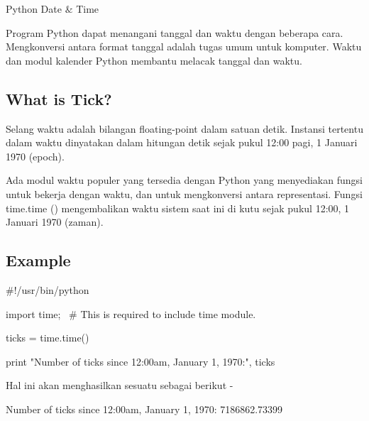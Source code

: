 \documentclass[a4paper,12pt]{report}
\begin{document}
\sloppy
\begin{center}{\fontsize{24pt}{24pt}\selectfont Python Date  $  \&  $ Time \\}\end{center} \par
\vspace{12pt}
\begin{adjustwidth}{0.03in}{0.03in}
 \hspace*{0.5in} Program Python dapat menangani tanggal dan waktu dengan beberapa cara. Mengkonversi antara format tanggal adalah tugas umum untuk komputer. Waktu dan modul kalender Python membantu melacak tanggal dan waktu.\end{adjustwidth}
 \par
\subsection*{What is Tick?}
 \par
\noindent 
Selang waktu adalah bilangan floating-point dalam satuan detik. Instansi tertentu dalam waktu dinyatakan dalam hitungan detik sejak pukul 12:00 pagi, 1 Januari 1970 (epoch). \par
\noindent 
Ada modul waktu populer yang tersedia dengan Python yang menyediakan fungsi untuk bekerja dengan waktu, dan untuk mengkonversi antara representasi. Fungsi time.time () mengembalikan waktu sistem saat ini di kutu sejak pukul 12:00, 1 Januari 1970 (zaman). \par
\vspace{12pt}
\subsection*{Example}
 \par
\vspace{12pt}
\noindent 
 \hspace*{0.5in}  $  \#  $!/usr/bin/python \par
\noindent 
 \hspace*{0.5in} import time;~  $  \#  $ This is required to include time module. \par
\vspace{12pt}
\noindent 
 \hspace*{0.5in} ticks = time.time() \par
\noindent 
 \hspace*{0.5in} print "Number of ticks since 12:00am, January 1, 1970:", ticks \par
\vspace{12pt}
\begin{adjustwidth}{0.03in}{0.03in}
Hal ini akan menghasilkan sesuatu sebagai berikut -\end{adjustwidth}
 \par
\noindent 
{\fontsize{9pt}{9pt}\selectfont  \hspace*{0.5in} Number of ticks since 12:00am, January 1, 1970: 7186862.73399} \par
\vspace{9pt}
\vspace{12pt}
\end{document}
